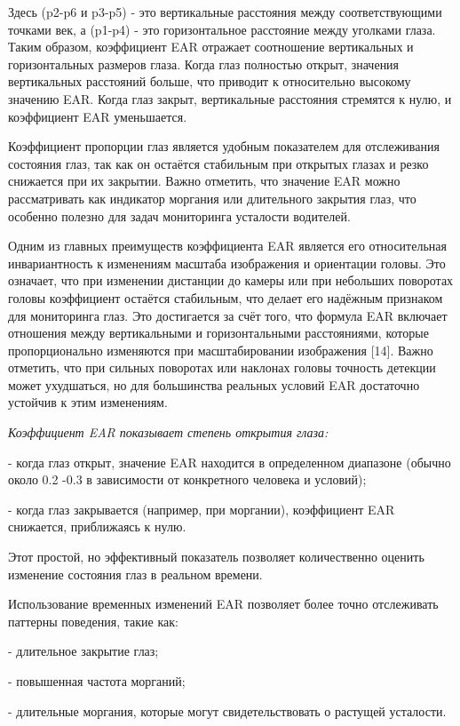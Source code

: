\documentclass[
]{article}
\begin{document}
Здесь (p2-p6 и p3-p5) - это вертикальные расстояния между
соответствующими точками век, а (p1-p4) - это горизонтальное расстояние
между уголками глаза. Таким образом, коэффициент EAR отражает
соотношение вертикальных и горизонтальных размеров глаза. Когда глаз
полностью открыт, значения вертикальных расстояний больше, что приводит
к относительно высокому значению EAR. Когда глаз закрыт, вертикальные
расстояния стремятся к нулю, и коэффициент EAR уменьшается.

Коэффициент пропорции глаз является удобным показателем для отслеживания
состояния глаз, так как он остаётся стабильным при открытых глазах и
резко снижается при их закрытии. Важно отметить, что значение EAR можно
рассматривать как индикатор моргания или длительного закрытия глаз, что
особенно полезно для задач мониторинга усталости водителей.

Одним из главных преимуществ коэффициента EAR является его относительная
инвариантность к изменениям масштаба изображения и ориентации головы.
Это означает, что при изменении дистанции до камеры или при небольших
поворотах головы коэффициент остаётся стабильным, что делает его
надёжным признаком для мониторинга глаз. Это достигается за счёт того,
что формула EAR включает отношения между вертикальными и горизонтальными
расстояниями, которые пропорционально изменяются при масштабировании
изображения {[}14{]}. Важно отметить, что при сильных поворотах или
наклонах головы точность детекции может ухудшаться, но для большинства
реальных условий EAR достаточно устойчив к этим изменениям.

\emph{Коэффициент EAR показывает степень открытия глаза:}

- когда глаз открыт, значение EAR находится в определенном диапазоне
(обычно около 0.2 -0.3 в зависимости от конкретного человека и условий);

- когда глаз закрывается (например, при моргании), коэффициент EAR
снижается, приближаясь к нулю.

Этот простой, но эффективный показатель позволяет количественно оценить
изменение состояния глаз в реальном времени.

Использование временных изменений EAR позволяет более точно отслеживать
паттерны поведения, такие как:

- длительное закрытие глаз;

- повышенная частота морганий;

- длительные моргания, которые могут свидетельствовать о растущей
усталости.
\end{document}
